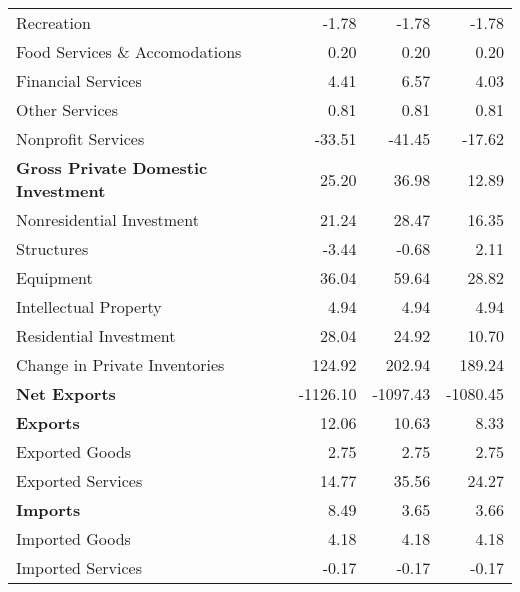 \documentclass[11pt, letterpaper]{article}\usepackage[]{graphicx}\usepackage[]{color}
\begin{document}
\begin{table}[H]
\begin{tabular}{lrrr}
  \hspace{16mm}  Recreation & -1.78 & -1.78 & -1.78 \\ 
  \hspace{16mm}  Food Services \& Accomodations & 0.20 & 0.20 & 0.20 \\ 
  \hspace{16mm}  Financial Services & 4.41 & 6.57 & 4.03 \\ 
  \hspace{16mm}  Other Services & 0.81 & 0.81 & 0.81 \\ 
  \hspace{16mm}  Nonprofit Services & -33.51 & -41.45 & -17.62 \\ 
  \hspace{0mm} \textbf{Gross Private Domestic Investment} & 25.20 & 36.98 & 12.89 \\ 
  \hspace{8mm}  Nonresidential Investment & 21.24 & 28.47 & 16.35 \\ 
  \hspace{16mm}  Structures & -3.44 & -0.68 & 2.11 \\ 
  \hspace{16mm}  Equipment & 36.04 & 59.64 & 28.82 \\ 
  \hspace{16mm}  Intellectual Property & 4.94 & 4.94 & 4.94 \\ 
  \hspace{8mm}  Residential Investment & 28.04 & 24.92 & 10.70 \\ 
  \hspace{8mm}  Change in Private Inventories & 124.92 & 202.94 & 189.24 \\ 
  \hspace{0mm} \textbf{Net Exports} & -1126.10 & -1097.43 & -1080.45 \\ 
  \hspace{0mm} \textbf{Exports} & 12.06 & 10.63 & 8.33 \\ 
  \hspace{8mm}  Exported Goods & 2.75 & 2.75 & 2.75 \\ 
  \hspace{8mm}  Exported Services & 14.77 & 35.56 & 24.27 \\ 
  \hspace{0mm} \textbf{Imports} & 8.49 & 3.65 & 3.66 \\ 
  \hspace{8mm}  Imported Goods & 4.18 & 4.18 & 4.18 \\ 
  \hspace{8mm}  Imported Services & -0.17 & -0.17 & -0.17 \\ 

\end{tabular}
\end{table}
\end{document}
